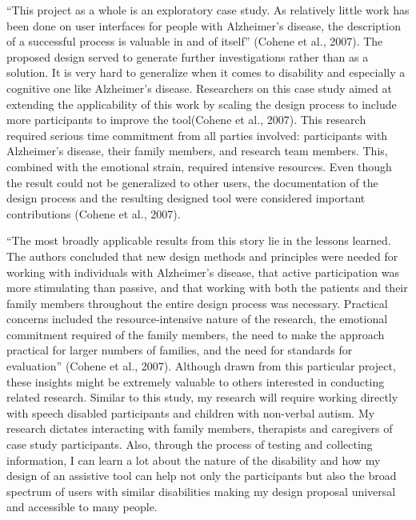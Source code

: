 “This project as a whole is an exploratory case study. As relatively little work has been done on user interfaces for people with Alzheimer’s disease, the description of a successful process is valuable in and of itself” (Cohene et al., 2007). The proposed design served to generate further investigations rather than as a solution. 
It is very hard to generalize when it comes to disability and especially a cognitive one like Alzheimer’s disease. Researchers on this case study aimed at extending the applicability of this work by scaling the design process to include more participants to improve the tool(Cohene et al., 2007).
This research required serious time commitment from all parties involved: participants with Alzheimer’s disease, their family members, and research team members. This, combined with the emotional strain, required intensive resources.  Even though the result could not be generalized to other users, the documentation of the design process and the resulting designed tool were considered important contributions (Cohene et al., 2007).

“The most broadly applicable results from this story lie in the lessons learned. The authors concluded that new design methods and principles were needed for working with individuals with Alzheimer's disease, that active participation was more stimulating than passive, and that working with both the patients and their family members throughout the entire design process was necessary. Practical concerns included the resource-intensive nature of the research, the emotional commitment required of the family members, the need to make the approach practical for larger numbers of families, and the need for standards for evaluation” (Cohene et al., 2007).
Although drawn from this particular project, these insights might be extremely valuable to others interested in conducting related research.
Similar to this study, my research will require working directly with speech disabled participants and children with non-verbal autism.  My research dictates interacting with family members, therapists and caregivers of case study participants.  Also, through the process of testing and collecting information, I can learn a lot about the nature of the disability and how my design of an assistive tool can help not only the participants but also the broad spectrum of users with similar disabilities making my design proposal universal and accessible to many people.

